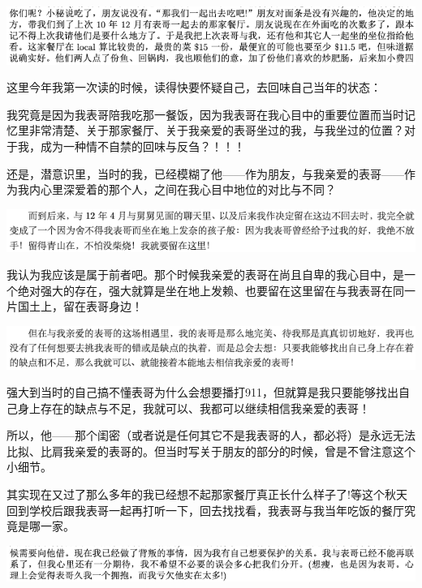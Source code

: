\documentclass[9pt, b5paper]{article}
\begin{document}
\begin{center}
\includegraphics[width=.9\linewidth]{./pic/backups_plans_20210501_124948.png}
\end{center}

这里今年我第一次读的时候，读得快要怀疑自己，去回味自己当年的状态：

我究竟是因为我表哥陪我吃那一餐饭，因为我表哥在我心目中的重要位置而当时记忆里非常清楚、关于那家餐厅、关于我亲爱的表哥坐过的我，与我坐过的位置？对于我，成为一种情不自禁的回味与反刍？！！！

还是，潜意识里，当时的我，已经模糊了他——作为朋友，与我亲爱的表哥——作为我内心里深爱着的那个人，之间在我心目中地位的对比与不同？

\begin{center}
\includegraphics[width=.9\linewidth]{./pic/backups_plans_20210501_125616.png}
\end{center}

我认为我应该是属于前者吧。那个时候我亲爱的表哥在尚且自卑的我心目中，是一个绝对强大的存在，强大就算是坐在地上发赖、也要留在这里留在与我表哥在同一片国土上，留在表哥身边！

\begin{center}
\includegraphics[width=.9\linewidth]{./pic/backups_plans_20210501_125921.png}
\end{center}

强大到当时的自己搞不懂表哥为什么会想要播打911，但就算是我只要能够找出自己身上存在的缺点与不足，我就可以、我都可以继续相信我亲爱的表哥！

所以，他——那个闺密（或者说是任何其它不是我表哥的人，都必将）是永远无法比拟、比肩我亲爱的表哥的。但当时写关于朋友的部分的时候，曾是不曾注意这个小细节。 

其实现在又过了那么多年的我已经想不起那家餐厅真正长什么样子了!等这个秋天回到学校后跟我表哥一起再打听一下，回去找找看，我表哥与我当年吃饭的餐厅究竟是哪一家。

\begin{center}
\includegraphics[width=.9\linewidth]{./pic/backups_plans_20210501_130013.png}
\end{center}
\end{document}
